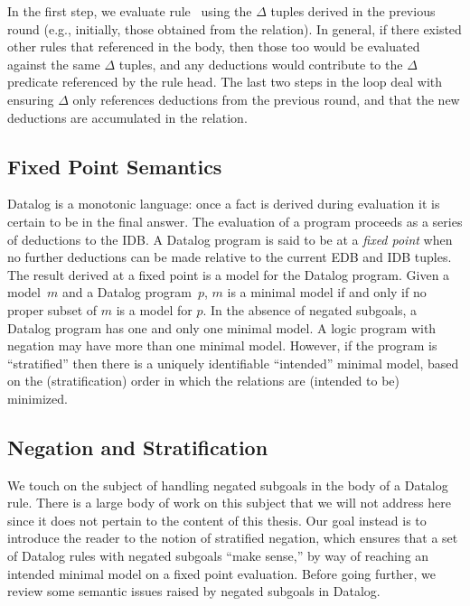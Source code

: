In the first step, we evaluate rule~ using the $\Delta$ tuples
derived in the previous round (e.g., initially, those obtained from the
 relation).  In general, if there existed other rules that referenced
 in the body, then those too would be evaluated against the same
$\Delta$ tuples, and any deductions would contribute to the $\Delta$
predicate referenced by the rule head.  The last two steps in the loop deal
with ensuring $\Delta$ only references deductions from the previous
round, and that the new deductions are accumulated in the  relation.


\subsection{Fixed Point Semantics}
\label{ch:p2:sec:fixpoint}

Datalog is a monotonic language: once a fact is derived during evaluation it is
certain to be in the final answer.  The evaluation of a program proceeds as a
series of deductions to the IDB.  A Datalog program is said to be at a {\em
fixed point} when no further deductions can be made relative to the current EDB
and IDB tuples.  The result derived at a fixed point is a model for the Datalog
program.  Given a model~$m$ and a Datalog program~$p$, $m$ is a minimal model
if and only if no proper subset of $m$ is a model for $p$.  In the absence of
negated subgoals, a Datalog program has one and only one minimal model.  A
logic program with negation may have more than one minimal model. However, if
the program is ``stratified'' then there is a uniquely identifiable
``intended'' minimal model, based on the (stratification) order in which the
relations are (intended to be) minimized.~\cite{deductive-database}


\subsection{Negation and Stratification}

We touch on the subject of handling negated subgoals in the body of a Datalog
rule.  There is a large body of work on this subject that we will not address
here since it does not pertain to the content of this thesis.  Our goal instead
is to introduce the reader to the notion of stratified negation, which ensures
that a set of Datalog rules with negated subgoals ``make sense,'' by way of
reaching an intended minimal model on a fixed point evaluation.  Before going
further, we review some semantic issues raised by negated subgoals in Datalog.

